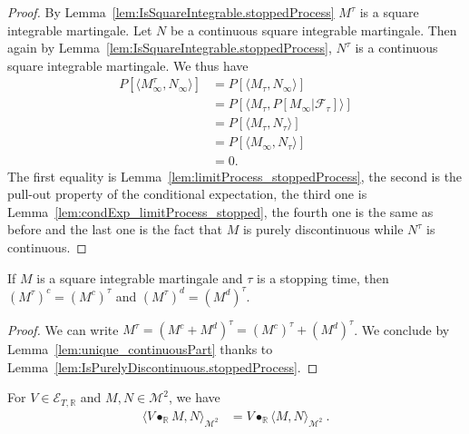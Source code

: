 \begin{proof}
  \leanok
By Lemma~\ref{lem:IsSquareIntegrable.stoppedProcess} $M^\tau$ is a square integrable martingale. Let $N$ be a continuous square integrable martingale. Then again by Lemma~\ref{lem:IsSquareIntegrable.stoppedProcess}, $N^\tau$ is a continuous square integrable martingale. We thus have
\begin{align*}
  P[\langle M^\tau_\infty, N_\infty\rangle] & = P[\langle M_\tau, N_\infty\rangle] \\
  & = P[\langle M_\tau, P[M_\infty | \mathcal{F}_\tau]\rangle] \\
  & = P[\langle M_\tau, N_\tau\rangle] \\
  & = P[\langle M_\infty, N_\tau\rangle] \\
  & = 0.
\end{align*}
The first equality is Lemma~\ref{lem:limitProcess_stoppedProcess}, the second is the pull-out property of the conditional expectation, the third one is Lemma~\ref{lem:condExp_limitProcess_stopped}, the fourth one is the same as before and the last one is the fact that $M$ is purely discontinuous while $N^\tau$ is continuous.
\end{proof}


\begin{lemma}\label{lem:continuousPart_stoppedProcess}
  \leanok
If $M$ is a square integrable martingale and $\tau$ is a stopping time, then $(M^\tau)^c = (M^c)^\tau$ and $(M^\tau)^d = (M^d)^\tau$.
\end{lemma}

\begin{proof}
  \leanok
We can write $M^\tau = (M^c + M^d)^\tau = (M^c)^\tau + (M^d)^\tau$. We conclude by Lemma~\ref{lem:unique_continuousPart} thanks to Lemma~\ref{lem:IsPurelyDiscontinuous.stoppedProcess}.
\end{proof}



\begin{lemma}\label{lem:inner_elemStochIntegral}
For $V \in \mathcal{E}_{T, \mathbb{R}}$ and $M, N \in \mathcal{M}^2$, we have
\begin{align*}
  \langle V \bullet_{\mathbb{R}} M, N \rangle_{\mathcal{M}^2}
  &= V \bullet_{\mathbb{R}} \langle M, N \rangle_{\mathcal{M}^2}
  \: .
\end{align*}
\end{lemma}

